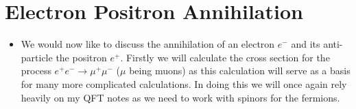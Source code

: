 \documentclass[11pt]{article}
\numberwithin{equation}{section}
\begin{document}
\newpage
\section{Electron Positron Annihilation} %
\label{sec:electron_positron_annihilation}
\begin{itemize}
    \item We would now like to discuss the annihilation of an electron $e^-$ and its anti-particle the positron $e^+$. Firstly we will calculate the cross section for the process $e^+e^- \rightarrow \mu^+\mu^-$ ($\mu$ being muons) as this calculation will serve as a basis for many more complicated calculations. In doing this we will once again rely heavily on my QFT notes as we need to work with spinors for the fermions. 
\end{itemize}
\end{document}
